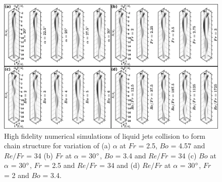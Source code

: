 \begin{figure}
    \centering
    \includegraphics[width=\linewidth]{chapters/jetJet/Figure8}
    \caption{High fidelity numerical simulations of liquid jets collision to form chain structure for variation of (a) $\alpha$ at $Fr$ = 2.5, $Bo$ = 4.57 and $Re/Fr$ = 34 (b) $Fr$ at $\alpha$ = 30$\degree$, $Bo$ = 3.4 and $Re/Fr$ = 34 (c) $Bo$ at $\alpha$ = 30$\degree$, $Fr$ = 2.5 and $Re/Fr$ = 34 and (d) $Re/Fr$ at $\alpha$ = 30$\degree$, $Fr$ = 2 and $Bo$ = 3.4.}
    \label{Figure::phaseContours}
\end{figure}
